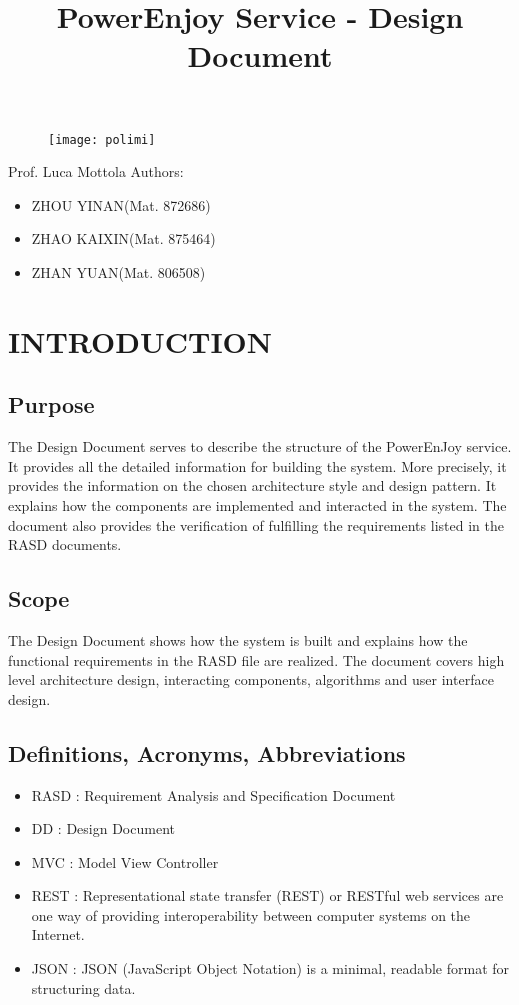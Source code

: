 \documentclass{article}
\title{PowerEnjoy Service - Design Document}
\begin{document}
\begin{titlepage}
\begin{figure}
	\centering
	\texttt{[image: polimi]}
\end{figure}
\maketitle
\centering
Prof. Luca Mottola
\newline
\raggedleft
Authors:
\begin{itemize}
	\raggedleft
	\item ZHOU YINAN(Mat. 872686)
	\item ZHAO KAIXIN(Mat. 875464)
	\item ZHAN YUAN(Mat. 806508)	
\end{itemize}
\end{titlepage}

\tableofcontents
\newpage

	
	\section{INTRODUCTION}
	\subsection{Purpose}
	The Design Document serves to describe the structure of the PowerEnJoy service. It provides all the detailed information for building the system. More precisely, it provides the information on the chosen architecture style and design pattern. It explains how the components are implemented and interacted in the system. The document also provides the verification of fulfilling the requirements listed in the RASD documents.
	\subsection{Scope}
	The Design Document shows how the system is built and explains how the functional requirements in the RASD file are realized. The document covers high level architecture design, interacting components,  algorithms and user interface design. 
	\subsection{Definitions, Acronyms, Abbreviations}
	\begin{itemize}
		\item RASD : Requirement Analysis and Specification Document
		\item DD : Design Document
		\item MVC : Model View Controller
		\item REST : Representational state transfer (REST) or RESTful web services are one way of providing interoperability between computer systems on the Internet.
		\item JSON : JSON (JavaScript Object Notation) is a minimal, readable format for structuring data. 
	\end{itemize}
\end{document}
